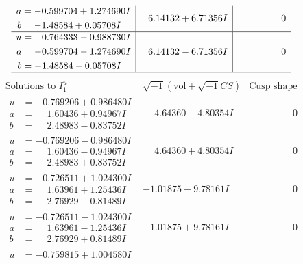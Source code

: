 \documentclass[1p]{elsarticle_modified}
\theoremstyle{definition}
\newcommand{\I}{\sqrt{-1}}
\begin{document}
$$\begin{array}{c|c|c}
\begin{aligned}
a &= -0.599704 + 1.274690 I \\
b &= -1.48584 + 0.05708 I\end{aligned}
 & \phantom{-}6.14132 + 6.71356 I & \phantom{-0.000000 } 0 \\ \hline\begin{aligned}
u &= \phantom{-}0.764333 - 0.988730 I \\
a &= -0.599704 - 1.274690 I \\
b &= -1.48584 - 0.05708 I\end{aligned}
 & \phantom{-}6.14132 - 6.71356 I & \phantom{-0.000000 } 0\\
 \hline 
 \end{array}$$\newpage$$\begin{array}{c|c|c}  
\text{Solutions to }I^u_{1}& \I (\text{vol} + \sqrt{-1}CS) & \text{Cusp shape}\\
 \hline 
\begin{aligned}
u &= -0.769206 + 0.986480 I \\
a &= \phantom{-}1.60436 + 0.94967 I \\
b &= \phantom{-}2.48983 - 0.83752 I\end{aligned}
 & \phantom{-}4.64360 - 4.80354 I & \phantom{-0.000000 } 0 \\ \hline\begin{aligned}
u &= -0.769206 - 0.986480 I \\
a &= \phantom{-}1.60436 - 0.94967 I \\
b &= \phantom{-}2.48983 + 0.83752 I\end{aligned}
 & \phantom{-}4.64360 + 4.80354 I & \phantom{-0.000000 } 0 \\ \hline\begin{aligned}
u &= -0.726511 + 1.024300 I \\
a &= \phantom{-}1.63961 + 1.25436 I \\
b &= \phantom{-}2.76929 - 0.81489 I\end{aligned}
 & -1.01875 - 9.78161 I & \phantom{-0.000000 } 0 \\ \hline\begin{aligned}
u &= -0.726511 - 1.024300 I \\
a &= \phantom{-}1.63961 - 1.25436 I \\
b &= \phantom{-}2.76929 + 0.81489 I\end{aligned}
 & -1.01875 + 9.78161 I & \phantom{-0.000000 } 0 \\ \hline\begin{aligned}
u &= -0.759815 + 1.004580 I \\

\end{aligned}
\end{array}$$
\end{document}
